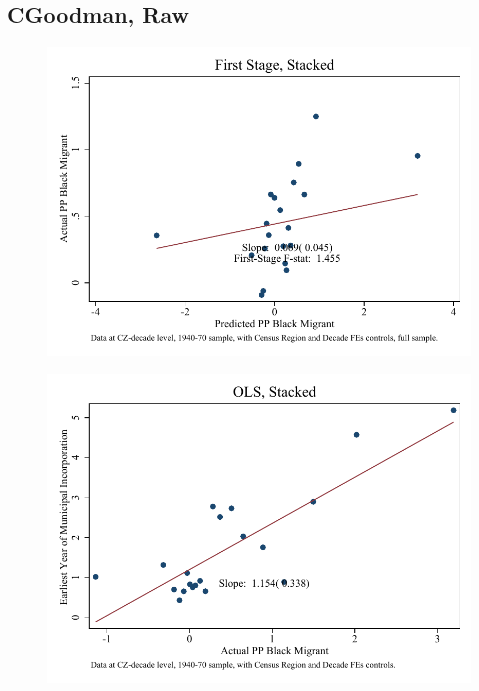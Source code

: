 \documentclass{article}
\begin{document}
\subsection{CGoodman, Raw}

\clearpage
\begin{figure}
\centering
\includegraphics{figures/simplefigs/stacked_cgoodman_raw_C3_full_fs.pdf}
\end{figure}
\clearpage
\begin{figure}
\centering
\includegraphics{figures/simplefigs/stacked_cgoodman_raw_C3_full_ols.pdf}
\end{figure}
\clearpage
\end{document}
